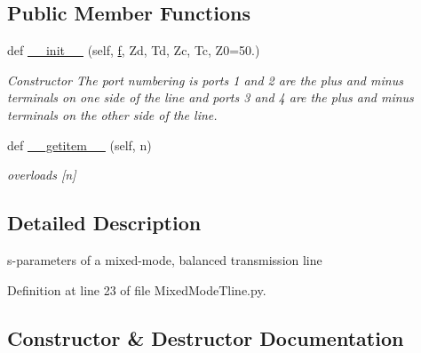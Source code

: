 \subsection*{Public Member Functions}
\begin{DoxyCompactItemize}
\item 
def \hyperlink{classSignalIntegrity_1_1SParameters_1_1Devices_1_1MixedModeTline_1_1MixedModeTLine_a9c295f4e84010f80b42cbb02c9ed5b5a}{\+\_\+\+\_\+init\+\_\+\+\_\+} (self, \hyperlink{classSignalIntegrity_1_1SParameters_1_1SParameters_1_1SParameters_a32e7a34d6837fe949b413c852a0447f8}{f}, Zd, Td, Zc, Tc, Z0=50.)
\begin{DoxyCompactList}\small\item\em Constructor The port numbering is ports 1 and 2 are the plus and minus terminals on one side of the line and ports 3 and 4 are the plus and minus terminals on the other side of the line. \end{DoxyCompactList}\item 
def \hyperlink{classSignalIntegrity_1_1SParameters_1_1Devices_1_1MixedModeTline_1_1MixedModeTLine_ab7a6da5139e0878b590d68292aaa70f2}{\+\_\+\+\_\+getitem\+\_\+\+\_\+} (self, n)
\begin{DoxyCompactList}\small\item\em overloads \mbox{[}n\mbox{]} \end{DoxyCompactList}\end{DoxyCompactItemize}


\subsection{Detailed Description}
s-\/parameters of a mixed-\/mode, balanced transmission line 

Definition at line 23 of file Mixed\+Mode\+Tline.\+py.



\subsection{Constructor \& Destructor Documentation}
\mbox{\label{classSignalIntegrity_1_1SParameters_1_1Devices_1_1MixedModeTline_1_1MixedModeTLine_a9c295f4e84010f80b42cbb02c9ed5b5a}} 
